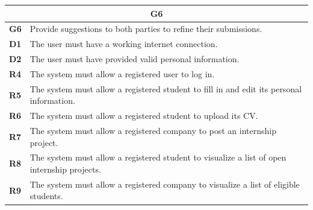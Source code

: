\begin{table}[H]
    \centering
    \begin{tabular}{|l|m{10cm}|}
        \hline \multicolumn{2}{|c|}{\textbf{G6}} \\
        \hline \textbf{G6} & Provide suggestions to both parties to refine their submissions. \\
        \hline \textbf{D1} & The user must have a working internet connection. \\
        \hline \textbf{D2} & The user must have provided valid personal information. \\
        \hline \textbf{R4} & The system must allow a registered user to log in. \\
        \hline \textbf{R5} & The system must allow a registered student to fill in and edit its personal information. \\
        \hline \textbf{R6} & The system must allow a registered student to upload its CV. \\
        \hline \textbf{R7} & The system must allow a registered company to post an internship project. \\
        \hline \textbf{R8} & The system must allow a registered student to visualize a list of open internship projects. \\
        \hline \textbf{R9} & The system must allow a registered company to visualize a list of eligible students. \\

\end{tabular}
\end{table}
